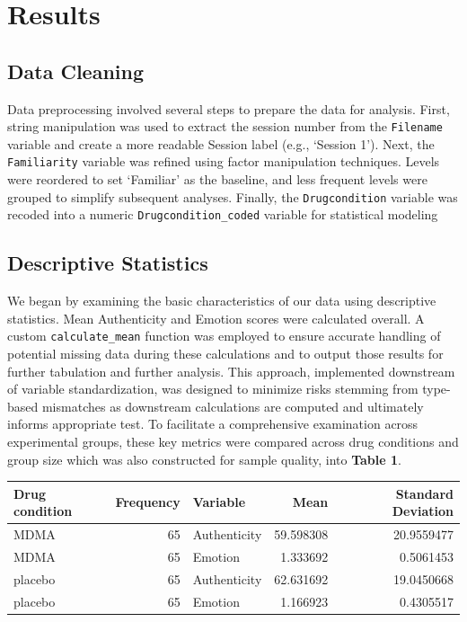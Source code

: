 \documentclass[
  man,
  longtable,
  nolmodern,
  notxfonts,
  notimes,
  colorlinks=true,linkcolor=blue,citecolor=blue,urlcolor=blue]{apa7}
\begin{document}
\section{Results}\label{results}

\subsection{Data Cleaning}\label{data-cleaning}

Data preprocessing involved several steps to prepare the data for
analysis. First, string manipulation was used to extract the session
number from the \texttt{Filename} variable and create a more readable
Session label (e.g., `Session 1'). Next, the \texttt{Familiarity}
variable was refined using factor manipulation techniques. Levels were
reordered to set `Familiar' as the baseline, and less frequent levels
were grouped to simplify subsequent analyses. Finally, the
\texttt{Drugcondition} variable was recoded into a numeric
\texttt{Drugcondition\_coded} variable for statistical modeling

\subsection{Descriptive Statistics}\label{descriptive-statistics}

We began by examining the basic characteristics of our data using
descriptive statistics. Mean Authenticity and Emotion scores were
calculated overall. A custom \texttt{calculate\_mean} function was
employed to ensure accurate handling of potential missing data during
these calculations and to output those results for further tabulation
and further analysis. This approach, implemented downstream of variable
standardization, was designed to minimize risks stemming from type-based
mismatches as downstream calculations are computed and ultimately
informs appropriate test. To facilitate a comprehensive examination
across experimental groups, these key metrics were compared across drug
conditions and group size which was also constructed for sample quality,
into \textbf{Table 1}.

\begin{table}

{\caption{{Discriptive Statistics}{\label{tbl-descp}}}
\vspace{-20pt}}

\begin{longtable}[]{@{}lrlrr@{}}
\toprule\noalign{}
Drug condition & Frequency & Variable & Mean & Standard Deviation \\
\midrule\noalign{}
\endhead
\bottomrule\noalign{}
\endlastfoot
MDMA & 65 & Authenticity & 59.598308 & 20.9559477 \\
MDMA & 65 & Emotion & 1.333692 & 0.5061453 \\
placebo & 65 & Authenticity & 62.631692 & 19.0450668 \\
placebo & 65 & Emotion & 1.166923 & 0.4305517 \\
\end{longtable}

\end{table}
\end{document}
